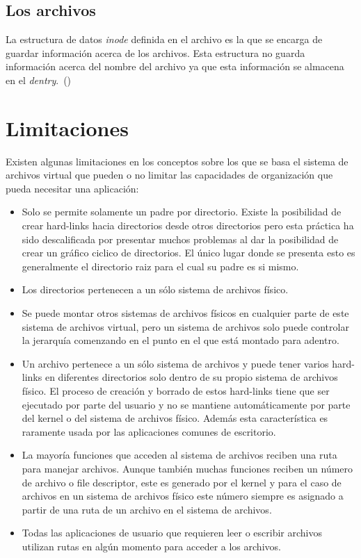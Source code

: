 \subsection{Los archivos}

La estructura de datos \textit{inode} definida en el archivo  es la que se encarga de guardar información acerca de los archivos. Esta estructura no guarda información acerca del nombre del archivo ya que esta información se almacena en el \textit{dentry}.~(\cite{inode:wikipedia})


\section{Limitaciones}

Existen algunas limitaciones en los conceptos sobre los que se basa el sistema de archivos virtual que pueden o no limitar las capacidades de organización que pueda necesitar una aplicación:

\begin{itemize}
\item Solo se permite solamente un padre por directorio. Existe la posibilidad de crear hard-links hacia directorios desde otros directorios pero esta práctica ha sido descalificada por presentar muchos problemas al dar la posibilidad de crear un gráfico ciclico de directorios. El único lugar donde se presenta esto es generalmente el directorio raiz para el cual su padre es si mismo.
\item Los directorios pertenecen a un sólo sistema de archivos físico.
\item Se puede montar otros sistemas de archivos físicos en cualquier parte de este sistema de archivos virtual, pero un sistema de archivos solo puede controlar la jerarquía comenzando en el punto en el que está montado para adentro.
\item Un archivo pertenece a un sólo sistema de archivos y puede tener varios hard-links en diferentes directorios solo dentro de su propio sistema de archivos físico. El proceso de creación y borrado de estos hard-links tiene que ser ejecutado por parte del usuario y no se mantiene automáticamente por parte del kernel o del sistema de archivos físico. Además esta característica es raramente usada por las aplicaciones comunes de escritorio.
\item La mayoría funciones que acceden al sistema de archivos reciben una ruta para manejar archivos. Aunque también muchas funciones reciben un número de archivo o file descriptor, este es generado por el kernel y para el caso de archivos en un sistema de archivos físico este número siempre es asignado a partir de una ruta de un archivo en el sistema de archivos.
\item Todas las aplicaciones de usuario que requieren leer o escribir archivos utilizan rutas en algún momento para acceder a los archivos.
\end{itemize}

